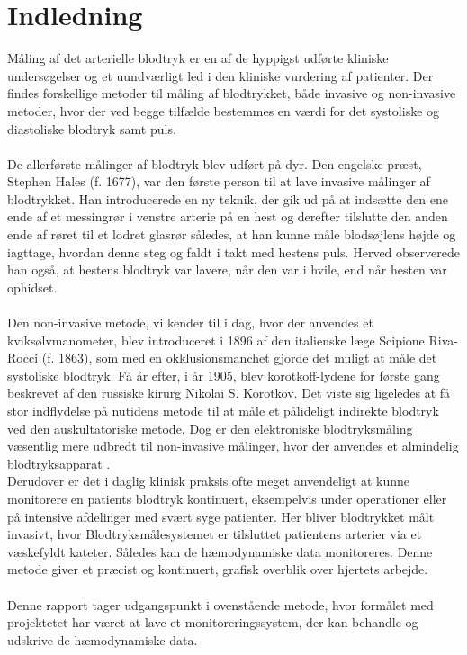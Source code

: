 \chapter{Indledning}
Måling af det arterielle blodtryk er en af de hyppigst udførte kliniske undersøgelser og et uundværligt led i den kliniske vurdering af patienter. Der findes forskellige metoder til måling af blodtrykket, både invasive og non-invasive metoder, hvor der ved begge tilfælde bestemmes en værdi for det systoliske og diastoliske blodtryk samt puls. \\\\
De allerførste målinger af blodtryk blev udført på dyr. Den engelske præst, Stephen Hales (f. 1677), var den første person til at lave invasive målinger af blodtrykket. Han introducerede en ny teknik, der gik ud på at indsætte den ene ende af et messingrør i venstre arterie på en hest og derefter tilslutte den anden ende af røret til et lodret glasrør således, at han kunne måle blodsøjlens højde og iagttage, hvordan denne steg og faldt i takt med hestens puls. Herved observerede han også, at hestens blodtryk var lavere, når den var i hvile, end når hesten var ophidset. \\\\
Den non-invasive metode, vi kender til i dag, hvor der anvendes et kviksølvmanometer, blev introduceret i 1896 af den italienske læge Scipione Riva-Rocci (f. 1863), som med en okklusionsmanchet gjorde det muligt at måle det systoliske blodtryk. Få år efter, i år 1905, blev korotkoff-lydene for første gang beskrevet af den russiske kirurg Nikolai S. Korotkov. Det viste sig ligeledes at få stor indflydelse på nutidens metode til at måle et pålideligt indirekte blodtryk ved den auskultatoriske metode. Dog er den elektroniske blodtryksmåling væsentlig mere udbredt til non-invasive målinger, hvor der anvendes et almindelig blodtryksapparat \cite{Note}. \\
Derudover er det i daglig klinisk praksis ofte meget anvendeligt at kunne monitorere en patients blodtryk kontinuert, eksempelvis under operationer eller på intensive afdelinger med svært syge patienter. Her bliver blodtrykket målt invasivt, hvor Blodtryksmålesystemet er tilsluttet patientens arterier via et væskefyldt kateter. Således kan de hæmodynamiske data monitoreres. Denne metode giver et præcist og kontinuert, grafisk overblik over hjertets arbejde. \\\\
Denne rapport tager udgangspunkt i ovenstående metode, hvor formålet med projektetet har været at lave et monitoreringssystem, der kan behandle og udskrive de hæmodynamiske data.
